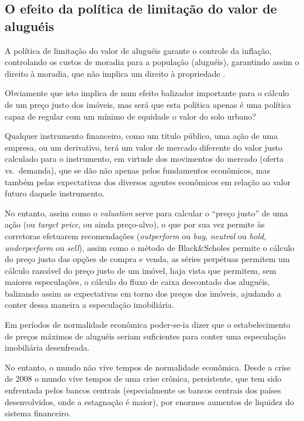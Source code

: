 \documentclass[
	12pt,				%
	oneside,			%
	a4paper,			%
	chapter=TITLE,		%
	section=TITLE,		%
	english,			%
	brazil				%
	]{abntex2}
\begin{document}
\subsection{O efeito da política de limitação do valor de
aluguéis}\label{o-efeito-da-poluxedtica-de-limitauxe7uxe3o-do-valor-de-aluguuxe9is}

A política de limitação do valor de aluguéis garante o controle da
inflação, controlando os custos de moradia para a população (aluguéis),
garantindo assim o direito à moradia, que não implica um direito à
propriedade \autocite{fnogueira}.

Obviamente que isto implica de num efeito balizador importante para o
cálculo de um preço justo dos imóveis, mas será que esta política apenas
é uma política capaz de regular com um mínimo de equidade o valor do
solo urbano?

Qualquer instrumento financeiro, como um título público, uma ação de uma
empresa, ou um derivativo, terá um valor de mercado diferente do valor
justo calculado para o instrumento, em virtude dos movimentos do mercado
(oferta vs.~demanda), que se dão não apenas pelos fundamentos
econômicos, mas também pelas expectativas dos diversos agentes
econômicos em relação ao valor futuro daquele instrumento.

No entanto, assim como o \emph{valuation} serve para calcular o ``preço
justo'' de uma ação (ou \emph{target price}, ou ainda preço-alvo), o que
por sua vez permite às corretoras efetuarem recomendações
(\emph{outperform} ou \emph{buy}, \emph{neutral} ou \emph{hold},
\emph{underperform} ou \emph{sell}), assim como o método de
Black\&Scholes \autocite{marins2} permite o cálculo do preço justo das
opções de compra e venda, as séries perpétuas permitem um cálculo
razoável do preço justo de um imóvel, haja vista que permitem, sem
maiores especulações, o cálculo do fluxo de caixa descontado dos
aluguéis, balizando assim as expectativas em torno dos preços dos
imóveis, ajudando a conter dessa maneira a especulação imobiliária.

Em períodos de normalidade econômica poder-se-ia dizer que o
estabelecimento de preços máximos de aluguéis seriam suficientes para
conter uma especulação imobiliária desenfreada.

No entanto, o mundo não vive tempos de normalidade econômica. Desde a
crise de 2008 o mundo vive tempos de uma crise crônica, persistente, que
tem sido enfrentada pelos bancos centrais (especialmente os bancos
centrais dos países desenvolvidos, onde a estagnação é maior), por
enormes aumentos de liquidez do sistema financeiro.
\end{document}
